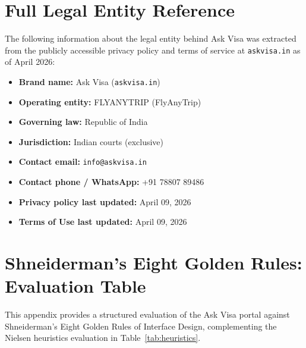 \documentclass[journal, 10pt, twoside]{IEEEtran}
\begin{document}
\section{Full Legal Entity Reference}
\label{app:legal}
The following information about the legal entity behind Ask Visa was
extracted from the publicly accessible privacy policy and terms of service
at \texttt{askvisa.in} as of April 2026:

\begin{itemize}
  \item \textbf{Brand name:} Ask Visa (\texttt{askvisa.in})
  \item \textbf{Operating entity:} FLYANYTRIP (FlyAnyTrip)
  \item \textbf{Governing law:} Republic of India
  \item \textbf{Jurisdiction:} Indian courts (exclusive)
  \item \textbf{Contact email:} \texttt{info@askvisa.in}
  \item \textbf{Contact phone / WhatsApp:} +91 78807 89486
  \item \textbf{Privacy policy last updated:} April 09, 2026
  \item \textbf{Terms of Use last updated:} April 09, 2026
\end{itemize}

\section{Shneiderman's Eight Golden Rules: Evaluation Table}
\label{app:shneiderman}
This appendix provides a structured evaluation of the Ask Visa portal
against Shneiderman's Eight Golden Rules of Interface Design, complementing
the Nielsen heuristics evaluation in Table~\ref{tab:heuristics}.
\end{document}
